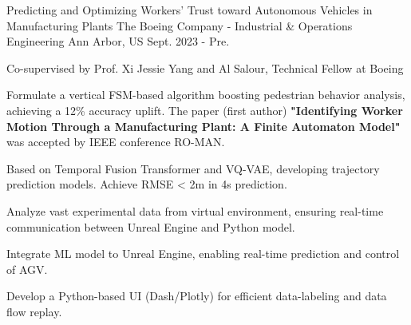 

\begin{cventries}
  \begin{cventry}
    {Predicting and Optimizing Workers’ Trust toward Autonomous Vehicles in Manufacturing Plants}
    {The Boeing Company - Industrial \& Operations Engineering}
    {Ann Arbor, US}
    {Sept. 2023 - Pre.}
    {
      \begin{cvitems}
      \item {Co-supervised by Prof. Xi Jessie Yang and Al Salour, Technical Fellow at Boeing}
      \item {Formulate a vertical FSM-based algorithm boosting pedestrian behavior analysis, achieving a 12\% accuracy uplift.
      The paper (first author) \textbf{"Identifying Worker Motion Through a Manufacturing Plant: A Finite Automaton Model"} was accepted by IEEE conference RO-MAN.}
      \item {Based on Temporal Fusion Transformer and VQ-VAE, developing trajectory prediction models. Achieve RMSE < 2m in 4s prediction.}
      \item {Analyze vast experimental data from virtual environment, ensuring real-time communication between Unreal Engine and Python model.}
      \item {Integrate ML model to Unreal Engine, enabling real-time prediction and control of AGV. }
      \item {Develop a Python-based UI (Dash/Plotly) for efficient data-labeling and data flow replay.}
    \end{cvitems}
    }
  
  \end{cventry}


\end{cventries}
